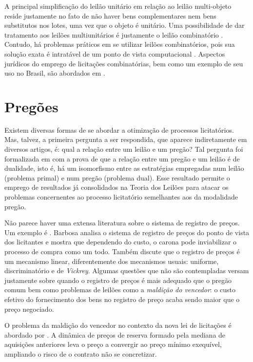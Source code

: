 A principal simplificação do leilão unitário em relação ao leilão multi-objeto reside justamente no fato de não haver bens complementares nem bens substitutos nos lotes, uma vez que o objeto é unitário. Uma possibilidade de dar tratamento aos leilões multiunitários é justamente o leilão combinatório \citet{Shoham2008}. Contudo, há problemas práticos em se utilizar leilões combinatórios, pois sua solução exata é intratável de um ponto de vista computacional \citet{Nisan2007}. Aspectos jurídicos do emprego de licitações combinatórias, bem como um exemplo de seu uso no Brasil, são abordados em \citet{pellegrini2018:MSc}.

\section{Pregões}

Existem diversas formas de se abordar a otimização de processos licitatórios. Mas, talvez, a primeira pergunta a ser respondida, que aparece indiretamente em diversos artigos, é: qual a relação entre um leilão e um pregão? Tal pergunta foi formalizada em \citet{deCastro2010} com a prova de que a relação entre um pregão e um leilão é de dualidade, isto é, há um isomorfismo entre as estratégias empregadas num leilão (problema primal) e num pregão (problema dual). Esse resultado permite o emprego de resultados já consolidados na Teoria dos Leilões para atacar os problemas concernentes ao processo licitatório semelhantes aos da modalidade pregão.

Não parece haver uma extensa literatura sobre o sistema de registro de preços. Um exemplo é \citet{barbosa2013}. Barbosa analisa o sistema de registro de preços do ponto de vista dos licitantes e mostra que dependendo do custo, o carona pode inviabilizar o processo de compra como um todo. Também discute que o registro de preços é um mecanismo linear, diferentemente dos mecanismos usuais: uniforme, discriminatório e de \emph{Vickrey}. Algumas questões que não são contempladas versam justamente sobre quando o registro de preços é mais adequado que o pregão comum bem como problemas de leilões como a \emph{maldição do vencedor}: o custo efetivo do fornecimento dos bens no registro de preço acaba sendo maior que o preço negociado.

O problema da maldição do vencedor no contexto da nova lei de licitações é abordado por \citet{Signor2022}. A dinâmica de preços de reserva formado pela mediana de aquisições anteriores leva o preço a convergir ao preço mínimo exequível, ampliando o risco de o contrato não se concretizar. 

